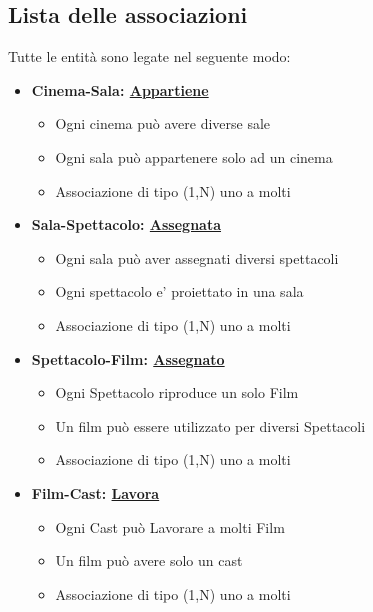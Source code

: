 \documentclass[10pt]{article}
\begin{document}
	\subsection{Lista delle associazioni}
	Tutte le entità sono legate nel seguente modo:
	\begin{itemize}
	    \item {\textbf{Cinema-Sala: \underline{Appartiene}}
		    \begin{itemize}
			    \item Ogni cinema può avere diverse sale
			    \item Ogni sala può appartenere solo ad un cinema
			    \item Associazione di tipo (1,N) uno a molti
		    \end{itemize}}
		    
		\item {\textbf{Sala-Spettacolo: \underline{Assegnata}}
		    \begin{itemize}
			    \item Ogni sala può aver assegnati diversi spettacoli
			    \item Ogni spettacolo e' proiettato in una sala
			    \item Associazione di tipo (1,N) uno a molti
		    \end{itemize}}
		        
		\item {\textbf{Spettacolo-Film: \underline{Assegnato}}
		    \begin{itemize}
			    \item Ogni Spettacolo riproduce un solo Film
			    \item Un film può essere utilizzato per diversi Spettacoli 
			    \item Associazione di tipo (1,N) uno a molti
		    \end{itemize}}
		    
		\item {\textbf{Film-Cast: \underline{Lavora}}
		    \begin{itemize}
			    \item Ogni Cast può Lavorare a molti Film
			    \item Un film può avere solo un cast 
			    \item Associazione di tipo (1,N) uno a molti
		    \end{itemize}}
		

\end{itemize}
\end{document}

